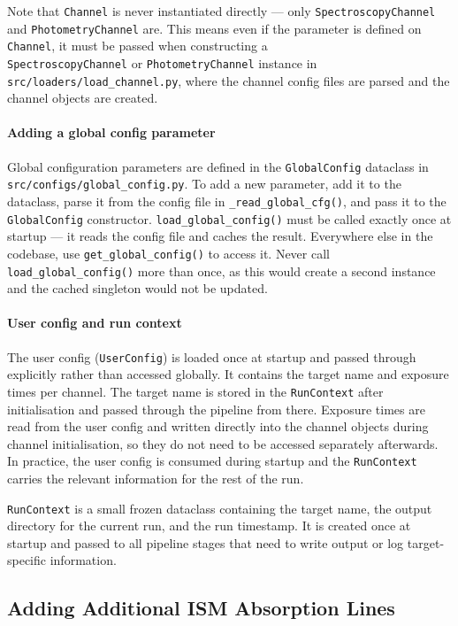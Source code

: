Note that \texttt{Channel} is never instantiated directly — only \texttt{SpectroscopyChannel} and \texttt{PhotometryChannel} are. This means even if the parameter is defined on \texttt{Channel}, it must be passed when constructing a \\ \texttt{SpectroscopyChannel} or \texttt{PhotometryChannel} instance in \texttt{src/loaders/load\_channel.py}, where the channel config files are parsed and the channel objects are created.

\paragraph{Adding a global config parameter} Global configuration parameters are defined in the \texttt{GlobalConfig} dataclass in \texttt{src/configs/global\_config.py}. To add a new parameter, add it to the dataclass, parse it from the config file in \texttt{\_read\_global\_cfg()}, and pass it to the \texttt{GlobalConfig} constructor. \texttt{load\_global\_config()} must be called exactly once at startup — it reads the config file and caches the result. Everywhere else in the codebase, use \texttt{get\_global\_config()} to access it. Never call \texttt{load\_global\_config()} more than once, as this would create a second instance and the cached singleton would not be updated.

\paragraph{User config and run context} The user config (\texttt{UserConfig}) is loaded once at startup and passed through explicitly rather than accessed globally. It contains the target name and exposure times per channel. The target name is stored in the \texttt{RunContext} after initialisation and passed through the pipeline from there. Exposure times are read from the user config and written directly into the channel objects during channel initialisation, so they do not need to be accessed separately afterwards. In practice, the user config is consumed during startup and the \texttt{RunContext} carries the relevant information for the rest of the run.

\texttt{RunContext} is a small frozen dataclass containing the target name, the output directory for the current run, and the run timestamp. It is created once at startup and passed to all pipeline stages that need to write output or log target-specific information.

\subsection{Adding Additional ISM Absorption Lines}

